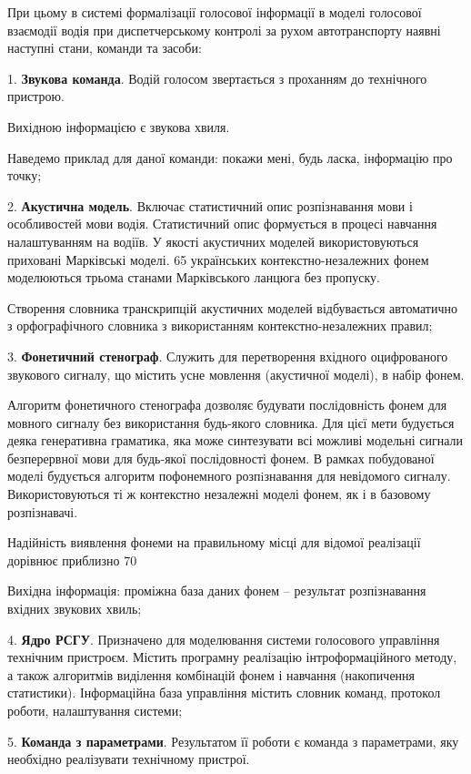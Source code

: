 При цьому в системі формалізації голосової інформації в моделі голосової взаємодії водія при диспетчерському контролі за рухом автотранспорту наявні наступні стани, команди та засоби:

1. \textbf{Звукова команда}. Водій голосом звертається з проханням до технічного пристрою.

Вихідною інформацією є звукова хвиля.

Наведемо приклад для даної команди: покажи мені, будь ласка, інформацію про точку;

2. \textbf{Акустична модель}. Включає статистичний опис розпізнавання мови і особливостей мови водія. Статистичний опис формується в процесі навчання налаштуванням на водіїв. У якості акустичних моделей використовуються приховані Марківські моделі. 65 українських контекстно-незалежних фонем моделюються трьома станами Марківського ланцюга без пропуску.

Створення словника транскрипцій акустичних моделей відбувається автоматично з орфографічного словника з використанням контекстно-незалежних правил;

3. \textbf{Фонетичний стенограф}. Служить для перетворення вхідного оцифрованого звукового сигналу, що містить усне мовлення (акустичної моделі), в набір фонем.

Алгоритм фонетичного стенографа дозволяє будувати послідовність фонем для мовного сигналу без використання будь-якого словника. Для цієї мети будується деяка генеративна граматика, яка може синтезувати всі можливі модельні сигнали безперервної мови для будь-якої послідовності фонем. В рамках побудованої моделі будується алгоритм пофонемного розпiзнавання для невідомого сигналу. Використовуються ті ж контекстно незалежні моделі фонем, як і в базовому розпізнавачі.

Надійність виявлення фонеми на правильному місці для відомої реалізації дорівнює приблизно 70%

Вихідна інформація: проміжна база даних фонем – результат розпізнавання вхідних звукових хвиль;

4. \textbf{Ядро РСГУ}. Призначено для моделювання системи голосового управління технічним пристроєм. Містить програмну реалізацію інтроформаційного методу, а також алгоритмів виділення комбінацій фонем і навчання (накопичення статистики). Інформаційна база управління містить словник команд, протокол роботи, налаштування системи;

5. \textbf{Команда з параметрами}. Результатом її роботи є команда з параметрами, яку необхідно реалізувати технічному пристрої.

